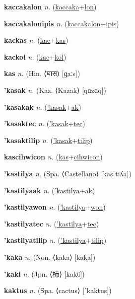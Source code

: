 \textbf{\hypertarget{kaccakalon}{kaccakalon}} \textit{n.} (\hyperlink{kaccaka}{kaccaka}+\allowbreak \hyperlink{lon}{lon})


\textbf{\hypertarget{kaccakalonipis}{kaccakalonipis}} \textit{n.} (\hyperlink{kaccakalon}{kaccakalon}+\allowbreak \hyperlink{ipis}{ipis})


\textbf{\hypertarget{kackas}{kackas}} \textit{n.} (\hyperlink{kac}{kac}+\allowbreak \hyperlink{kas}{kas})


\textbf{\hypertarget{kackol}{kackol}} \textit{n.} (\hyperlink{kac}{kac}+\allowbreak \hyperlink{kol}{kol})


\textbf{\hypertarget{kas}{kas}} \textit{n.} (Hin. ⟨{\devanagari{}घास}⟩ [ɡ̤aːs])


\textbf{\hypertarget{'kasak}{'kasak}} \textit{n.} (Kaz. ⟨Kazak⟩ [qɑzɑq])


\textbf{\hypertarget{'kasakak}{'kasakak}} \textit{n.} (\hyperlink{'kasak}{'kasak}+\allowbreak \hyperlink{ak}{ak})


\textbf{\hypertarget{'kasaktec}{'kasaktec}} \textit{n.} (\hyperlink{'kasak}{'kasak}+\allowbreak \hyperlink{tec}{tec})


\textbf{\hypertarget{'kasaktilip}{'kasaktilip}} \textit{n.} (\hyperlink{'kasak}{'kasak}+\allowbreak \hyperlink{tilip}{tilip})


\textbf{\hypertarget{kascihwicon}{kascihwicon}} \textit{n.} (\hyperlink{kas}{kas}+\allowbreak \hyperlink{cihwicon}{cihwicon})


\textbf{\hypertarget{'kastilya}{'kastilya}} \textit{n.} (Spa. ⟨Castellano⟩ [kasˈtiʎa])


\textbf{\hypertarget{'kastilyaak}{'kastilyaak}} \textit{n.} (\hyperlink{'kastilya}{'kastilya}+\allowbreak \hyperlink{ak}{ak})


\textbf{\hypertarget{'kastilyawon}{'kastilyawon}} \textit{n.} (\hyperlink{'kastilya}{'kastilya}+\allowbreak \hyperlink{won}{won})


\textbf{\hypertarget{'kastilyatec}{'kastilyatec}} \textit{n.} (\hyperlink{'kastilya}{'kastilya}+\allowbreak \hyperlink{tec}{tec})


\textbf{\hypertarget{'kastilyatilip}{'kastilyatilip}} \textit{n.} (\hyperlink{'kastilya}{'kastilya}+\allowbreak \hyperlink{tilip}{tilip})


\textbf{\hypertarget{'kaka}{'kaka}} \textit{n.} (Non. ⟨kaka⟩ [kaka])


\textbf{\hypertarget{'kaki}{'kaki}} \textit{n.} (Jpn. ⟨{\japanese{}柿}⟩ [kakʲi])


\textbf{\hypertarget{kaktus}{kaktus}} \textit{n.} (Spa. ⟨cactus⟩ [ˈkaktus])


